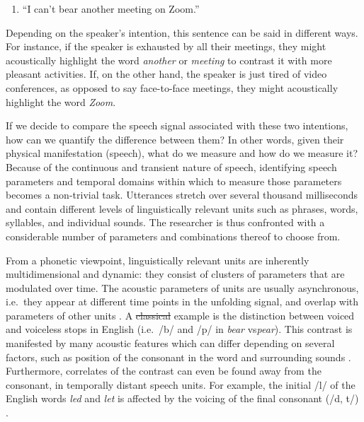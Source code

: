 \documentclass[Review,times,sageh]{sagej}
\providecommand{\tightlist}{\setlength{\itemsep}{0pt}\setlength{\parskip}{0pt}}
\providecommand{\DIFaddtex}[1]{{\protect\color{blue}\uwave{#1}}} %
\providecommand{\DIFdeltex}[1]{{\protect\color{red}\sout{#1}}}                      %
\providecommand{\DIFaddbegin}{} %
\providecommand{\DIFaddend}{} %
\providecommand{\DIFdelbegin}{} %
\providecommand{\DIFdelend}{} %
\providecommand{\DIFadd}[1]{\texorpdfstring{\DIFaddtex{#1}}{#1}} %
\providecommand{\DIFdel}[1]{\texorpdfstring{\DIFdeltex{#1}}{}} %
\begin{document}
\vspace{1em}

\begin{enumerate}
\def\labelenumi{(\arabic{enumi})}
\tightlist
\item
  ``I can't bear another meeting on Zoom.''
  \vspace{1em}
\end{enumerate}

\DIFaddbegin \noindent \DIFaddend Depending on the speaker's intention, this sentence can be said in different ways.
For instance, if the speaker is exhausted by all their meetings, they might acoustically highlight the word \emph{another} or \emph{meeting} to contrast it with more pleasant activities.
If, on the other hand, the speaker is just tired of video conferences, as opposed to say face-to-face meetings, they might acoustically highlight the word \emph{Zoom}.

If we decide to compare the speech signal associated with these two intentions, how can we quantify the difference between them?
In other words, given their physical manifestation (speech), what do we measure and how do we measure it?
Because of the continuous and transient nature of speech, identifying speech parameters and temporal domains within which to measure those parameters becomes a non-trivial task.
Utterances stretch over several thousand milliseconds and contain different levels of linguistically relevant units such as phrases, words, syllables, and individual sounds.
The researcher is thus confronted with a considerable number of parameters and combinations thereof to choose from.

From a phonetic viewpoint, linguistically relevant units are inherently multidimensional and dynamic: they consist of clusters of parameters that are modulated over time.
The acoustic parameters of units are usually asynchronous, i.e.~they appear at different time points in the unfolding signal, and overlap with parameters of other units \citep[e.g.][]{jongman2000acoustic, lisker1986voicing, summerfield1981articulatory, winter2014spoken}.
A \DIFdelbegin \DIFdel{classical }\DIFdelend \DIFaddbegin \DIFadd{classic }\DIFaddend example is the distinction between voiced and voiceless stops in English (i.e.~/b/ and /p/ in \emph{bear} vs\DIFaddbegin \DIFadd{.~}\DIFaddend \emph{pear}).
This contrast is manifested by many acoustic features which can differ depending on several factors, such as \DIFaddbegin \DIFadd{the }\DIFaddend position of the consonant in the word and \DIFaddbegin \DIFadd{context of }\DIFaddend surrounding sounds \citep{lisker1977rapid}.
Furthermore, correlates of the contrast can even be found away from the consonant, in temporally distant speech units.
For example, the initial /l/ of the English words \emph{led} and \emph{let} is affected by the voicing of the final consonant (/d, t/) \citep{hawkins2004influence}.
\end{document}
